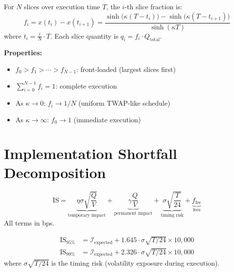 \documentclass[11pt,a4paper]{article}
\begin{document}
\begin{formulabox}[title={\S2.4 — Slice Fractions}]
For $N$ slices over execution time $T$, the $i$-th slice fraction is:
\begin{equation}
  f_i = x(t_i) - x(t_{i+1}) = \frac{\sinh\!\bigl(\kappa(T - t_i)\bigr) - \sinh\!\bigl(\kappa(T - t_{i+1})\bigr)}{\sinh(\kappa T)}
\end{equation}
where $t_i = \frac{i}{N} \cdot T$. Each slice quantity is $q_i = f_i \cdot Q_{\text{total}}$.

\vspace{0.5em}
\textbf{Properties:}
\begin{itemize}[nosep]
  \item $f_0 > f_1 > \cdots > f_{N-1}$: front-loaded (largest slices first)
  \item $\sum_{i=0}^{N-1} f_i = 1$: complete execution
  \item As $\kappa \to 0$: $f_i \to 1/N$ (uniform TWAP-like schedule)
  \item As $\kappa \to \infty$: $f_0 \to 1$ (immediate execution)
\end{itemize}
\end{formulabox}


\section{Implementation Shortfall Decomposition}

\begin{formulabox}[title={\S3.1 — IS Decomposition}]
\begin{equation}
  \text{IS} = \underbrace{\eta \sigma \sqrt{\frac{Q}{V}}}_{\text{temporary impact}} + \underbrace{\gamma \frac{Q}{V}}_{\text{permanent impact}} + \underbrace{\sigma \sqrt{\frac{T}{24}}}_{\text{timing risk}} + \underbrace{f_{\text{fee}}}_{\text{fees}}
\end{equation}
All terms in bps.
\end{formulabox}

\begin{formulabox}[title={\S3.2 — IS at Confidence Intervals}]
\begin{align}
  \text{IS}_{95\%} &= \mathcal{I}_{\text{expected}} + 1.645 \cdot \sigma\sqrt{T/24} \times 10{,}000 \\
  \text{IS}_{99\%} &= \mathcal{I}_{\text{expected}} + 2.326 \cdot \sigma\sqrt{T/24} \times 10{,}000
\end{align}
where $\sigma\sqrt{T/24}$ is the timing risk (volatility exposure during execution).
\end{formulabox}
\end{document}
